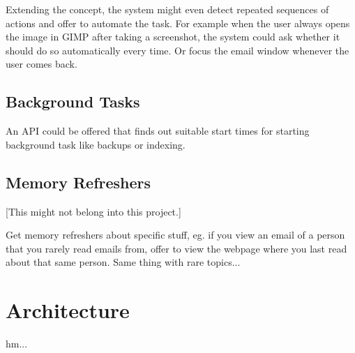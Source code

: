 \documentclass[]{article}
\begin{document}
Extending the concept, the system might even detect repeated sequences
of actions and offer to automate the task. For example when the user
always opens the image in GIMP after taking a screenshot, the system
could ask whether it should do so automatically every time. Or focus
the email window whenever the user comes back.

\subsection{Background Tasks}
An API could be offered that finds out suitable start times for
starting background task like backups or indexing.

\subsection{Memory Refreshers}

[This might not belong into this project.]

Get memory refreshers about specific stuff, eg. if you view an email
of a person that you rarely read emails from, offer to view the
webpage where you last read about that same person. Same thing with
rare topics...

\section{Architecture}
hm...
\end{document}
